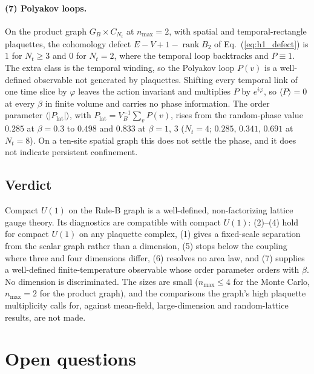 \documentclass[11pt]{article}
\begin{document}
\paragraph{(7) Polyakov loops.}
On the product graph $G_B\times C_{N_t}$ at $n_{\max}=2$, with spatial and
temporal-rectangle plaquettes, the cohomology defect
$E-V+1-\operatorname{rank}B_2$ of Eq.~(\ref{eq:h1_defect}) is $1$ for
$N_t\ge3$ and $0$ for $N_t=2$, where the temporal loop backtracks and
$P\equiv1$.  The extra class is the temporal winding, so the Polyakov loop
$P(v)$ is a well-defined observable not generated by plaquettes.  Shifting
every temporal link of one time slice by $\varphi$ leaves the action
invariant and multiplies $P$ by $e^{i\varphi}$, so $\langle P\rangle=0$ at
every $\beta$ in finite volume and carries no phase information.  The order
parameter $\langle|P_{\mathrm{lat}}|\rangle$, with
$P_{\mathrm{lat}}=V_B^{-1}\sum_vP(v)$, rises from the random-phase value
$0.285$ at $\beta=0.3$ to $0.498$ and $0.833$ at $\beta=1$, $3$ ($N_t=4$;
$0.285$, $0.341$, $0.691$ at $N_t=8$).  On a ten-site spatial graph this
does not settle the phase, and it does not indicate persistent confinement.

\subsection{Verdict}

Compact $U(1)$ on the Rule-B graph is a well-defined, non-factorizing
lattice gauge theory.  Its diagnostics are compatible with compact $U(1)$:
(2)--(4) hold for compact $U(1)$ on any plaquette complex, (1) gives a
fixed-scale separation from the scalar graph rather than a dimension, (5)
stops below the coupling where three and four dimensions differ, (6)
resolves no area law, and (7) supplies a well-defined finite-temperature
observable whose order parameter orders with $\beta$.  No dimension is
discriminated.  The sizes are small ($n_{\max}\le4$ for the Monte Carlo,
$n_{\max}=2$ for the product graph), and the comparisons the graph's high
plaquette multiplicity calls for, against mean-field, large-dimension and
random-lattice results, are not made.

\section{Open questions}
\label{sec:open}
\end{document}
